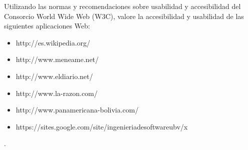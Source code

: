 Utilizando las normas y recomendaciones sobre usabilidad y accesibilidad del Consorcio World Wide Web (W3C), valore la accesibilidad y usabilidad de las siguientes aplicaciones Web:
\begin{itemize}
\item http://es.wikipedia.org/
\item http://www.meneame.net/
\item http://www.eldiario.net/
\item http://www.la-razon.com/
\item http://www.panamericana-bolivia.com/
\item https://sites.google.com/site/ingenieriadesoftwareubv/x
\end{itemize}
.
